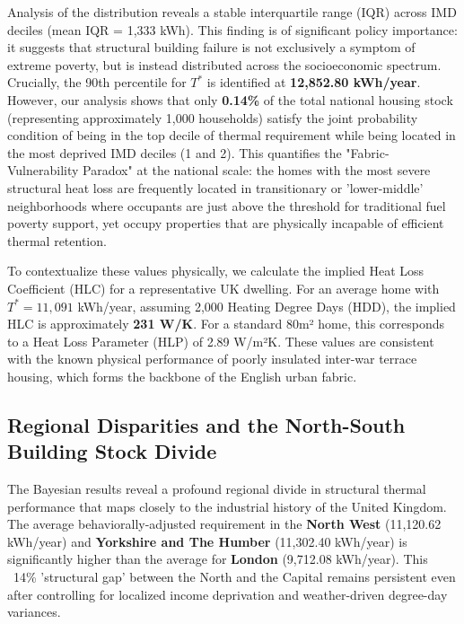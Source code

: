 \documentclass[11pt, a4paper, twocolumn]{article}
\begin{document}
Analysis of the distribution reveals a stable interquartile range (IQR) across IMD deciles (mean IQR = 1,333 kWh). This finding is of significant policy importance: it suggests that structural building failure is not exclusively a symptom of extreme poverty, but is instead distributed across the socioeconomic spectrum. Crucially, the 90th percentile for $T^*$ is identified at \textbf{12,852.80 kWh/year}. However, our analysis shows that only \textbf{0.14\%} of the total national housing stock (representing approximately 1,000 households) satisfy the joint probability condition of being in the top decile of thermal requirement while being located in the most deprived IMD deciles (1 and 2). This quantifies the "Fabric-Vulnerability Paradox" at the national scale: the homes with the most severe structural heat loss are frequently located in transitionary or 'lower-middle' neighborhoods where occupants are just above the threshold for traditional fuel poverty support, yet occupy properties that are physically incapable of efficient thermal retention.

To contextualize these values physically, we calculate the implied Heat Loss Coefficient (HLC) 
for a representative UK dwelling. For an average home with $T^* = 11,091$ kWh/year, 
assuming 2,000 Heating Degree Days (HDD), the implied HLC is approximately \textbf{231 W/K}. 
For a standard 80m² home, this corresponds to a Heat Loss Parameter (HLP) of 2.89 W/m²K. These values are consistent with the known physical performance of poorly insulated inter-war terrace housing, which forms the backbone of the English urban fabric.

\subsection{Regional Disparities and the North-South Building Stock Divide}\label{regional-disparities}

The Bayesian results reveal a profound regional divide in structural thermal performance that maps closely to the industrial history of the United Kingdom. The average behaviorally-adjusted requirement in the \textbf{North West} (11,120.62 kWh/year) and \textbf{Yorkshire and The Humber} (11,302.40 kWh/year) is significantly higher than the average for \textbf{London} (9,712.08 kWh/year). This ~14\% 'structural gap' between the North and the Capital remains persistent even after controlling for localized income deprivation and weather-driven degree-day variances.
\end{document}
